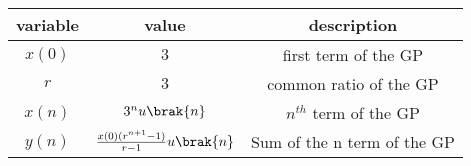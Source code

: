 \begin{tabular}{|c|c|c|}
   \hline
   variable&value&description  \\
   \hline
   $x(0)$ & $3$ & first term of the GP\\
   \hline
   $r$ & $3$ & common ratio of the GP\\
   \hline
   $x(n)$ & $3^{n}u\brak{n}$& $n^{th}$ term of the GP\\
   \hline
   $y(n)$ &$\frac{x(0)(r^{n+1}-1)}{r-1}u\brak{n}$ &Sum of the n term of the GP\\
   \hline 
\end{tabular}

